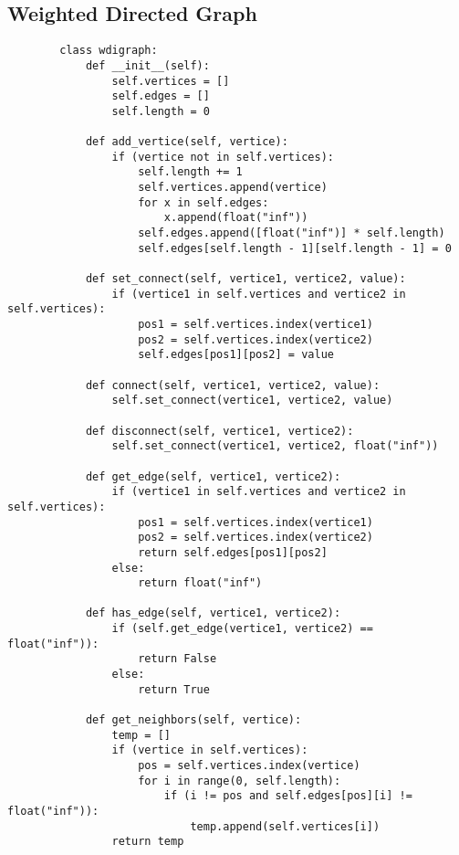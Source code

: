     \newpage





\subsection{ Weighted Directed Graph }

    \begin{lstlisting}
        class wdigraph:
            def __init__(self):
                self.vertices = []
                self.edges = []
                self.length = 0

            def add_vertice(self, vertice):
                if (vertice not in self.vertices):
                    self.length += 1
                    self.vertices.append(vertice)
                    for x in self.edges:
                        x.append(float("inf"))
                    self.edges.append([float("inf")] * self.length)
                    self.edges[self.length - 1][self.length - 1] = 0    

            def set_connect(self, vertice1, vertice2, value):
                if (vertice1 in self.vertices and vertice2 in self.vertices):
                    pos1 = self.vertices.index(vertice1)
                    pos2 = self.vertices.index(vertice2)
                    self.edges[pos1][pos2] = value
                    
            def connect(self, vertice1, vertice2, value):
                self.set_connect(vertice1, vertice2, value)
                
            def disconnect(self, vertice1, vertice2):
                self.set_connect(vertice1, vertice2, float("inf"))

            def get_edge(self, vertice1, vertice2):
                if (vertice1 in self.vertices and vertice2 in self.vertices):
                    pos1 = self.vertices.index(vertice1)
                    pos2 = self.vertices.index(vertice2)
                    return self.edges[pos1][pos2]
                else:
                    return float("inf")
                
            def has_edge(self, vertice1, vertice2):
                if (self.get_edge(vertice1, vertice2) == float("inf")):
                    return False
                else:
                    return True
                
            def get_neighbors(self, vertice):
                temp = []
                if (vertice in self.vertices):
                    pos = self.vertices.index(vertice)
                    for i in range(0, self.length):
                        if (i != pos and self.edges[pos][i] != float("inf")):
                            temp.append(self.vertices[i])
                return temp
    \end{lstlisting}








